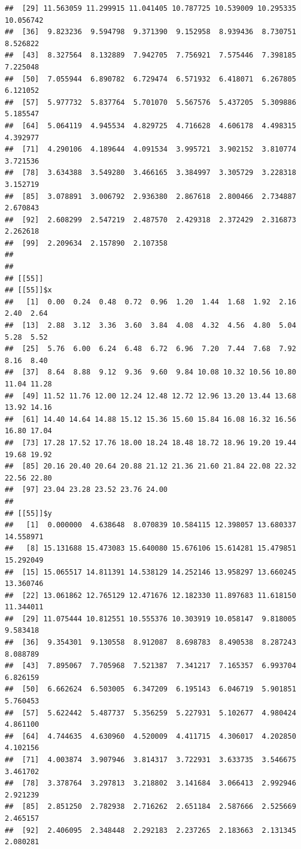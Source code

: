 \documentclass[
  ignorenonframetext,
]{beamer}
\begin{document}
\begin{frame}[fragile]{}
\begin{verbatim}
##  [29] 11.563059 11.299915 11.041405 10.787725 10.539009 10.295335 10.056742
##  [36]  9.823236  9.594798  9.371390  9.152958  8.939436  8.730751  8.526822
##  [43]  8.327564  8.132889  7.942705  7.756921  7.575446  7.398185  7.225048
##  [50]  7.055944  6.890782  6.729474  6.571932  6.418071  6.267805  6.121052
##  [57]  5.977732  5.837764  5.701070  5.567576  5.437205  5.309886  5.185547
##  [64]  5.064119  4.945534  4.829725  4.716628  4.606178  4.498315  4.392977
##  [71]  4.290106  4.189644  4.091534  3.995721  3.902152  3.810774  3.721536
##  [78]  3.634388  3.549280  3.466165  3.384997  3.305729  3.228318  3.152719
##  [85]  3.078891  3.006792  2.936380  2.867618  2.800466  2.734887  2.670843
##  [92]  2.608299  2.547219  2.487570  2.429318  2.372429  2.316873  2.262618
##  [99]  2.209634  2.157890  2.107358
## 
## 
## [[55]]
## [[55]]$x
##   [1]  0.00  0.24  0.48  0.72  0.96  1.20  1.44  1.68  1.92  2.16  2.40  2.64
##  [13]  2.88  3.12  3.36  3.60  3.84  4.08  4.32  4.56  4.80  5.04  5.28  5.52
##  [25]  5.76  6.00  6.24  6.48  6.72  6.96  7.20  7.44  7.68  7.92  8.16  8.40
##  [37]  8.64  8.88  9.12  9.36  9.60  9.84 10.08 10.32 10.56 10.80 11.04 11.28
##  [49] 11.52 11.76 12.00 12.24 12.48 12.72 12.96 13.20 13.44 13.68 13.92 14.16
##  [61] 14.40 14.64 14.88 15.12 15.36 15.60 15.84 16.08 16.32 16.56 16.80 17.04
##  [73] 17.28 17.52 17.76 18.00 18.24 18.48 18.72 18.96 19.20 19.44 19.68 19.92
##  [85] 20.16 20.40 20.64 20.88 21.12 21.36 21.60 21.84 22.08 22.32 22.56 22.80
##  [97] 23.04 23.28 23.52 23.76 24.00
## 
## [[55]]$y
##   [1]  0.000000  4.638648  8.070839 10.584115 12.398057 13.680337 14.558971
##   [8] 15.131688 15.473083 15.640080 15.676106 15.614281 15.479851 15.292049
##  [15] 15.065517 14.811391 14.538129 14.252146 13.958297 13.660245 13.360746
##  [22] 13.061862 12.765129 12.471676 12.182330 11.897683 11.618150 11.344011
##  [29] 11.075444 10.812551 10.555376 10.303919 10.058147  9.818005  9.583418
##  [36]  9.354301  9.130558  8.912087  8.698783  8.490538  8.287243  8.088789
##  [43]  7.895067  7.705968  7.521387  7.341217  7.165357  6.993704  6.826159
##  [50]  6.662624  6.503005  6.347209  6.195143  6.046719  5.901851  5.760453
##  [57]  5.622442  5.487737  5.356259  5.227931  5.102677  4.980424  4.861100
##  [64]  4.744635  4.630960  4.520009  4.411715  4.306017  4.202850  4.102156
##  [71]  4.003874  3.907946  3.814317  3.722931  3.633735  3.546675  3.461702
##  [78]  3.378764  3.297813  3.218802  3.141684  3.066413  2.992946  2.921239
##  [85]  2.851250  2.782938  2.716262  2.651184  2.587666  2.525669  2.465157
##  [92]  2.406095  2.348448  2.292183  2.237265  2.183663  2.131345  2.080281

\end{verbatim}
\end{frame}
\end{document}
